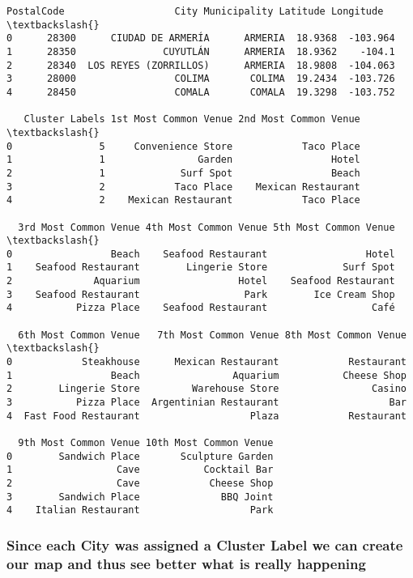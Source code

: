 \documentclass[11pt]{article}
\makeatletter
\newcommand{\boxspacing}{\kern\kvtcb@left@rule\kern\kvtcb@boxsep}
\newcommand{\prompt}[4]{
        \ttfamily\llap{{\color{#2}[#3]:\hspace{3pt}#4}}\vspace{-\baselineskip}
    }
\makeatother
\begin{document}
            \begin{tcolorbox}[breakable, size=fbox, boxrule=.5pt, pad at break*=1mm, opacityfill=0]
\prompt{Out}{outcolor}{36}{\boxspacing}
\begin{Verbatim}[commandchars=\\\{\}]
  PostalCode                   City Municipality Latitude Longitude  \textbackslash{}
0      28300      CIUDAD DE ARMERÍA      ARMERIA  18.9368  -103.964
1      28350               CUYUTLÁN      ARMERIA  18.9362    -104.1
2      28340  LOS REYES (ZORRILLOS)      ARMERIA  18.9808  -104.063
3      28000                 COLIMA       COLIMA  19.2434  -103.726
4      28450                 COMALA       COMALA  19.3298  -103.752

   Cluster Labels 1st Most Common Venue 2nd Most Common Venue  \textbackslash{}
0               5     Convenience Store            Taco Place
1               1                Garden                 Hotel
2               1             Surf Spot                 Beach
3               2            Taco Place    Mexican Restaurant
4               2    Mexican Restaurant            Taco Place

  3rd Most Common Venue 4th Most Common Venue 5th Most Common Venue  \textbackslash{}
0                 Beach    Seafood Restaurant                 Hotel
1    Seafood Restaurant        Lingerie Store             Surf Spot
2              Aquarium                 Hotel    Seafood Restaurant
3    Seafood Restaurant                  Park        Ice Cream Shop
4           Pizza Place    Seafood Restaurant                  Café

  6th Most Common Venue   7th Most Common Venue 8th Most Common Venue  \textbackslash{}
0            Steakhouse      Mexican Restaurant            Restaurant
1                 Beach                Aquarium           Cheese Shop
2        Lingerie Store         Warehouse Store                Casino
3           Pizza Place  Argentinian Restaurant                   Bar
4  Fast Food Restaurant                   Plaza            Restaurant

  9th Most Common Venue 10th Most Common Venue
0        Sandwich Place       Sculpture Garden
1                  Cave           Cocktail Bar
2                  Cave            Cheese Shop
3        Sandwich Place              BBQ Joint
4    Italian Restaurant                   Park
\end{Verbatim}
\end{tcolorbox}
        
    \hypertarget{since-each-city-was-assigned-a-cluster-label-we-can-create-our-map-and-thus-see-better-what-is-really-happening}{%
\subsubsection{Since each City was assigned a Cluster Label we can
create our map and thus see better what is really
happening}\label{since-each-city-was-assigned-a-cluster-label-we-can-create-our-map-and-thus-see-better-what-is-really-happening}}
\end{document}

